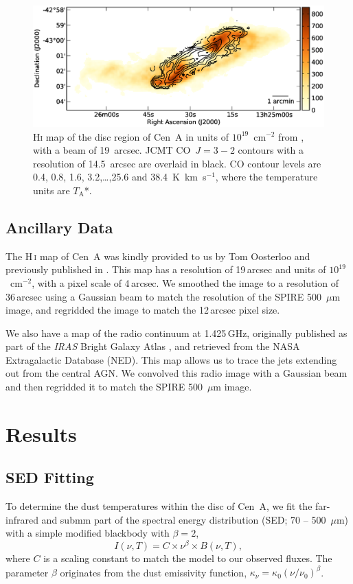 \begin{figure}
\includegraphics[width=\columnwidth]{ch2/Fig2_CenA_gas_obs}
\caption[H\textsc{i} map of the disc region of Cen~A overlaid with CO~$J=3-2$ contours]{H\textsc{i} map of the disc region of Cen~A in units of $10^{19}$~cm$^{-2}$ from \citet[][; colourscale]{2010A&A...515A..67S}, with a beam of 19~arcsec.  JCMT CO~$J=3-2$ contours with a resolution of 14.5~arcsec are overlaid in black.  CO contour levels are 0.4, 0.8, 1.6, 3.2,\ldots,25.6 and 38.4~K~km~s$^{-1}$, where the temperature units are $T_{\mathrm{A}}$*.}
\label{fig:co_map}
\end{figure}

\subsection{Ancillary Data}\label{subsec:Ancillary}
The H\,\textsc{i} map of Cen~A was kindly provided to us by Tom Oosterloo and previously published in \citet{2010A&A...515A..67S}.  This map has a resolution of 19\,arcsec and units of $10^{19}$~cm$^{-2}$, with a pixel scale of 4\,arcsec.  We smoothed the image to a resolution of 36\,arcsec using a Gaussian beam to match the resolution of the SPIRE 500~$\mu$m image, and regridded the image to match the 12\,arcsec pixel size.

We also have a map of the radio continuum at 1.425\,GHz, originally published as part of the \emph{IRAS} Bright Galaxy Atlas \citep{1996ApJS..103...81C}, and retrieved from the NASA Extragalactic Database (NED).  This map allows us to trace the jets extending out from the central AGN.  We convolved this radio image with a Gaussian beam and then regridded it to match the SPIRE 500~$\mu$m image.


\section{Results}\label{sec:results}
\subsection{SED Fitting}\label{subsec:sed}
To determine the dust temperatures within the disc of Cen~A, we fit the far-infrared and submm part of the spectral energy distribution (SED; 70 -- 500~$\mu$m) with a simple modified blackbody with $\beta = 2$,
\begin{equation}\label{eqn:blackbody}
 I(\nu,T) = C \times \nu^{\beta} \times B(\nu,T),
\end{equation}
where $C$ is a scaling constant to match the model to our observed fluxes.  The parameter $\beta$ originates from the dust emissivity function, $\kappa_{\nu} = \kappa_{0}(\nu/\nu_{0})^{\beta}$.

